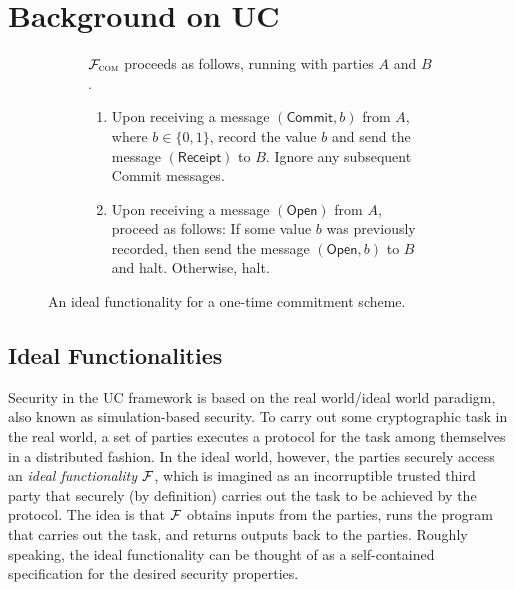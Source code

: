 \section{Background on UC}
\label{sec:background}

\begin{figure}
\begin{subfigure}{.6\textwidth}
\begin{func}
    $\mathcal{{F}}_{\textsc{com}}$ proceeds as follows, running with parties $A$ and
  $B$.
    \begin{enumerate}
        \item Upon receiving a message $(\mathsf{Commit}, b)$ from $A$, where $b
          \in \{ 0, 1 \}$, record the value $b$ and send the message
          $(\mathsf{Receipt})$ to $B$. Ignore any subsequent \textsf{Commit}
          messages.
        \item Upon receiving a message $(\mathsf{Open})$ from $A$, proceed as
          follows: If some value $b$ was previously recorded, then send the
          message $(\mathsf{Open}, b)$ to $B$ and halt. Otherwise, halt.
    \end{enumerate}
\end{func}
\label{func:com}
\end{subfigure}\hspace{.04\textwidth}%
\begin{subfigure}{.35\textwidth}
  
\end{subfigure}
\caption{An ideal functionality for a one-time commitment scheme.}
\end{figure}

\subsection{Ideal Functionalities}
\label{subsec:functionalities}

Security in the UC framework is based on the real world/ideal world paradigm,
also known as simulation-based security. To carry out some cryptographic task in
the real world, a set of parties executes a protocol for the task among
themselves in a distributed fashion. In the ideal world, however, the parties
securely access an \emph{ideal functionality} $\mathcal{{F}}$, which is imagined as an
incorruptible trusted third party that securely (by definition) carries out the
task to be achieved by the protocol. The idea is that $\mathcal{{F}}$ obtains inputs
from the parties, runs the program that carries out the task, and returns
outputs back to the parties. Roughly speaking, the ideal functionality can be
thought of as a self-contained specification for the desired security
properties.

